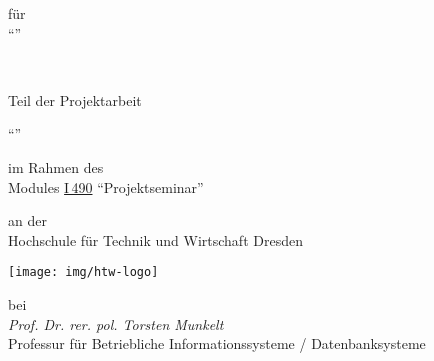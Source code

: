 \begin{titlepage}
	\centering
\vfill
	{
		\scshape\Huge \DOCNAME \par
	}
	\vspace{1cm}
	{
		\LARGE für \\%
		\enquote{\ProjTitle{}} \par
	}




\vfill

\newpage


\,

\vspace{4cm}

{

{
	\large{ Teil der Projektarbeit } \par \vspace{.2cm}
	\LARGE{ \enquote{\ProjTitle{}} }
	\par \vspace{.4cm}
	\scriptsize {
		im Rahmen des
	} \\
	Modules \href{https://apps.htw-dresden.de/modulux.php?mod=2071}{I\,490} \enquote{Projektseminar} \par \vspace{.3cm}

	\scriptsize{
		an der
	} \\
	\large{
		Hochschule für Technik und Wirtschaft Dresden
	}

		\par \vspace{.5cm}
		\centering
		\texttt{[image: img/htw-logo]}
		\par \vspace{.3cm}

	\scriptsize{
		bei
	} \\
	\emph{
		Prof. Dr. rer. pol. Torsten Munkelt
	} \\
	\footnotesize{
		Professur für Betriebliche Informationssysteme / Datenbanksysteme
	} \par \vspace{.3cm}

}}
\end{titlepage}
